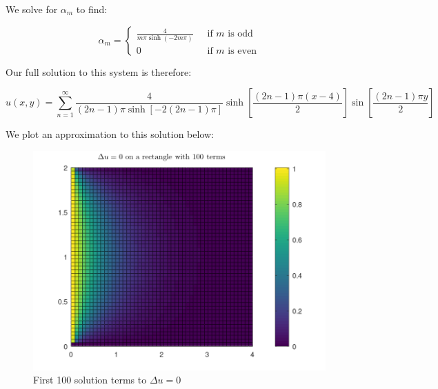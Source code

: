 \begin{solution}
  We solve for $\alpha_m$ to find:

  $$
  \alpha_m = \begin{cases}
    \frac{4}{m \pi \sinh(-2m \pi)} &\; \text{ if } m \text{ is odd} \\
    0               &\; \text{ if } m \text{ is even}
  \end{cases}
  $$

  Our full solution to this system is therefore:

  $$
  u(x, y) = \sum\limits_{n=1}^{\infty} \frac{4}{(2n - 1) \pi \sinh{\left[-2(2n - 1) \pi\right]}} \sinh{\left[ \frac{(2n - 1) \pi (x - 4)}{2} \right]} \sin{\left[\frac{(2n - 1) \pi y}{2}\right]}
  $$

  \vfill
  We plot an approximation to this solution below:

  \begin{figure}[h]
    \centering
    \includegraphics[width=\textwidth]{problem_1.png}
    \caption{First 100 solution terms to $\Delta u = 0$}
  \end{figure}

  \ \\
\end{solution}